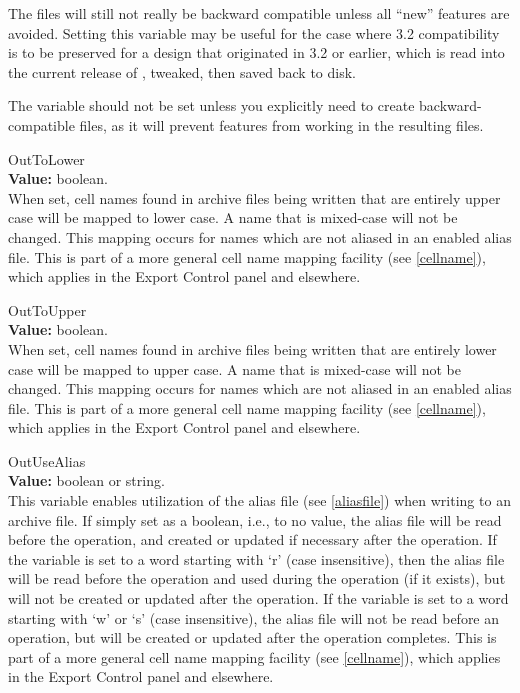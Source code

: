 \begin{description}
The files will still not really be backward compatible unless all
``new'' features are avoided.  Setting this variable may be useful for
the case where 3.2 compatibility is to be preserved for a design that
originated in 3.2 or earlier, which is read into the current release
of {\Xic}, tweaked, then saved back to disk.

The variable should not be set unless you explicitly need to create
backward-compatible files, as it will prevent features from working in
the resulting files.

\item{\et OutToLower}\\
{\bf Value:} boolean.\\
When set, cell names found in archive files being written that are
entirely upper case will be mapped to lower case.  A name that is
mixed-case will not be changed.  This mapping occurs for names which
are not aliased in an enabled alias file.  This is part of a more
general cell name mapping facility (see \ref{cellname}), which applies
in the {\cb Export Control} panel and elsewhere.

\item{\et OutToUpper}\\
{\bf Value:} boolean.\\
When set, cell names found in archive files being written that are
entirely lower case will be mapped to upper case.  A name that is
mixed-case will not be changed.  This mapping occurs for names which
are not aliased in an enabled alias file.  This is part of a more
general cell name mapping facility (see \ref{cellname}), which applies
in the {\cb Export Control} panel and elsewhere.

\item{\et OutUseAlias}\\
{\bf Value:} boolean or string.\\
This variable enables utilization of the alias file (see
\ref{aliasfile}) when writing to an archive file.  If simply set as a
boolean, i.e., to no value, the alias file will be read before the
operation, and created or updated if necessary after the operation. 
If the variable is set to a word starting with `{\vt r}' (case
insensitive), then the alias file will be read before the operation
and used during the operation (if it exists), but will not be created
or updated after the operation.  If the variable is set to a word
starting with `{\vt w}' or `{\vt s}' (case insensitive), the alias
file will not be read before an operation, but will be created or
updated after the operation completes.  This is part of a more general
cell name mapping facility (see \ref{cellname}), which applies
in the {\cb Export Control} panel and elsewhere.


\end{description}

